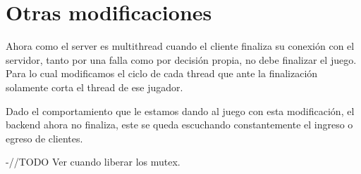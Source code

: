 \section{Otras modificaciones}

Ahora como el server es multithread cuando el cliente finaliza su conexi\'on con el servidor, tanto por una falla como por decisi\'on propia, no debe finalizar el juego. Para lo cual modificamos el ciclo de cada thread que ante la finalizaci\'on solamente corta el thread de ese jugador.

Dado el comportamiento que le estamos dando al juego con esta modificaci\'on, el backend ahora no finaliza, este se queda escuchando constantemente el ingreso o egreso de clientes.

-//TODO Ver cuando liberar los mutex.